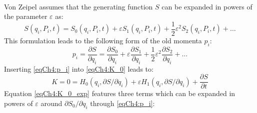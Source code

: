 		\paragraph{  \\}
		\indent Von Zeipel assumes that the generating function $S$ can be expanded in powers of the parameter $\varepsilon$ as:
		\begin{equation}
		S(q_i, P_i, t) = S_0(q_i, P_i, t) + \varepsilon S_1(q_i, P_i, t) + \dfrac{1}{2} \varepsilon^2 S_2(q_i, P_i, t) + \ldots
		\label{eqCh4:S}
		\end{equation}
		\indent This formulation leads to the following form of the old momenta $p_i$:
		\begin{equation}
		p_i =  \dfrac{\partial S}{\partial q_i} = \dfrac{\partial S_0}{\partial q_i} + \varepsilon \dfrac{\partial S_1}{\partial q_i} + \dfrac{1}{2} \varepsilon^2 \dfrac{\partial S_2}{\partial q_i} + \ldots
		\label{eqCh4:p_i}
		\end{equation}
		\indent Inserting \eqref{eqCh4:p_i} into \eqref{eqCh4:K_0} leads to:
		\begin{equation}
		K = 0  = H_0(q_i, \partial S/\partial q_i) + \varepsilon H_1(q_i, \partial S/\partial q_i) + \dfrac{\partial S}{\partial t}
		\label{eqCh4:K_0_exp}
		\end{equation}
		\indent Equation \eqref{eqCh4:K_0_exp} features three terms which can be expanded in powers of $\varepsilon$ around $\partial S_0/\partial q_i$ through \eqref{eqCh4:p_i}:
